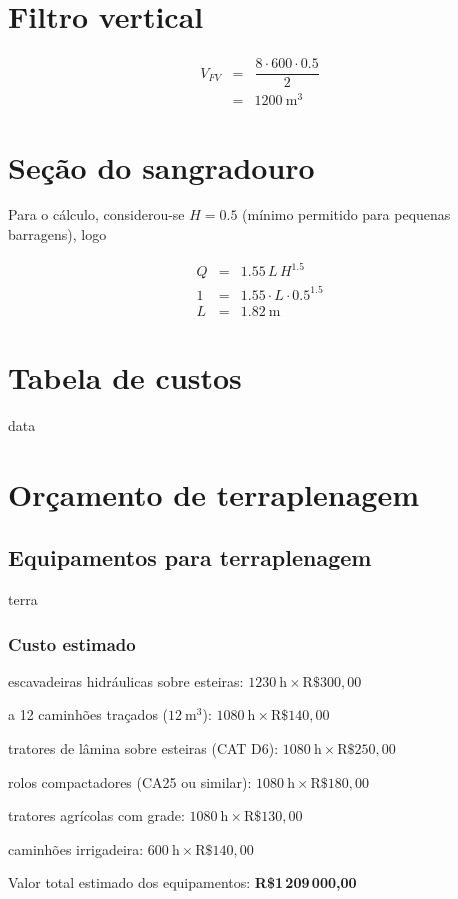 \documentclass[a4paper, 12pt, brazilian]{article}
\begin{document}
	\section{Filtro vertical}
	
	\begin{eqnarray}
		V_{FV}&=&\dfrac{8\cdot 600\cdot 0.5}{2}\\
		&=&\SI{1200}{\meter^{3}}
	\end{eqnarray}
	
	\section{Seção do sangradouro}
	
	Para o cálculo, considerou-se $H=0.5$ (mínimo permitido para pequenas barragens), logo
	
	\begin{eqnarray}
		Q&=&1.55\,L\,H^{1.5}\\
		1&=&1.55\cdot L\cdot 0.5^{1.5}\\
		L&=&\SI{1.82}{\meter}
	\end{eqnarray}
	
	\section{Tabela de custos}
	
	{data}
	
	\newpage
	
	\section{Orçamento de terraplenagem}
	
	\subsection{Equipamentos para terraplenagem}
	
	{terra}
	
	\subsubsection{Custo estimado}
	
	 escavadeiras hidráulicas sobre esteiras: $\SI{1230}{\hour}\times\textrm{R\$}300,00$
	
	 a 12 caminhões traçados ($\SI{12}{\meter^{3}}$): $\SI{1080}{\hour}\times\textrm{R\$}140,00$
	
	 tratores de lâmina sobre esteiras (CAT D6): $\SI{1080}{\hour}\times\textrm{R\$}250,00$
	
	 rolos compactadores (CA25 ou similar):  $\SI{1080}{\hour}\times\textrm{R\$}180,00$
	
	 tratores agrícolas com grade: $\SI{1080}{\hour}\times\textrm{R\$}130,00$
	
	 caminhões irrigadeira:  $\SI{600}{\hour}\times\textrm{R\$}140,00$
	
	\noindent Valor total estimado dos equipamentos: \textbf{R\$1\,209\,000,00}
	
	
	
\end{document}
